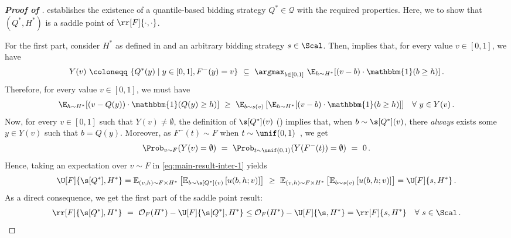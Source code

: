 \begin{proof}[\textbf{Proof of }]
	 establishes the existence of a quantile-based bidding strategy $Q^* \in \mathcal{Q}$ with the required properties. Here, we to show that $(Q^*, H^*)$ is a saddle point of $\rr[F]{\cdot, \cdot }$.
	
	For the first part, consider $H^*$ as defined in  and an arbitrary bidding strategy $s \in \Scal$. Then,  implies that, for every value $v \in [0,1]$, we have
	\begin{align*}
		Y(v)\ \coloneqq\ \{Q^*(y) \mid y \in[0,1],F^-(y) = v\}\ \subseteq\ \argmax_{b \in [0,1]}\ \E_{h \sim H^*}[(v - b) \cdot \mathbbm{1}(b \geq h)]\,.
	\end{align*}
	Therefore, for every value $v \in [0,1]$, we must have
	\begin{align}\label{eq:main-result-inter-1}
		\E_{h \sim H^*}[(v - Q(y)) \cdot \mathbbm{1}(Q(y) \geq h)]\ \geq\ \E_{b \sim s(v)}\left[ \E_{h \sim H^*}[(v - b) \cdot \mathbbm{1}(b \geq h)] \right] &&\forall\ y \in Y(v)\,.
	\end{align}
	Now, for every $v \in [0,1]$ such that $Y(v) \neq \emptyset$, the definition of $\s[Q^*](v)$ () implies that, when $b \sim \s[Q^*](v)$, there \emph{always} exists some $y \in Y(v)$ such that $b = Q(y)$. Moreover, as $F^-(t) \sim F$ when $t \sim \unif(0,1)$~\citep{embrechts2013note}, we get
	\begin{align*}
		\Prob_{v \sim F}(Y(v) = \emptyset)\ =\ \Prob_{t \sim \unif(0,1)}(Y(F^-(t)) = \emptyset)\ =\ 0\,.
	\end{align*}
	Hence, taking an expectation over $v\sim F$ in \eqref{eq:main-result-inter-1} yields
	\begin{align*}
		\U[F]{\s[Q^*], H^*} = \mathbb{E}_{(v, h) \sim F \times H^*}  \left[ \mathbb{E}_{b \sim \s[Q^*](v)} \left[ u(b,h; v) \right] \right]\ \geq\ \mathbb{E}_{(v, h) \sim F \times H^*}  \left[ \mathbb{E}_{b \sim s(v)} \left[ u(b,h; v) \right] \right] = \U[F]{s, H^*}\,.
	\end{align*}
	As a direct consequence, we get the first part of the saddle point result:
	\begin{align*}
		\rr[F]{\s[Q^*], H^*}\ =\ \mathcal{O}_{F}(H^*) - \U[F]{\s[Q^*], H^*} \leq \mathcal{O}_{F}(H^*) - \U[F]{\s, H^*} = \rr[F]{s,H^*} \quad \forall\ s\in \Scal\,.
	\end{align*}
	

\end{proof}
